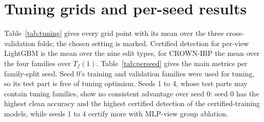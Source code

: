 \documentclass[preprint,12pt,authoryear]{elsarticle}
\begin{document}
\FloatBarrier
\section{Tuning grids and per-seed results}\label{app:tuning}
Table~\ref{tab:tuning} gives every grid point with its mean over the three cross-validation folds; the chosen setting is marked. Certified detection for per-view LightGBM is the mean over the nine edit types, for CROWN-IBP the mean over the four families over $T_f(1)$. Table~\ref{tab:perseed} gives the main metrics per family-split seed. Seed 0's training and validation families were used for tuning, so its test part is free of tuning optimism. Seeds 1 to 4, whose test parts may contain tuning families, show no consistent advantage over seed 0: seed 0 has the highest clean accuracy and the highest certified detection of the certified-training models, while seeds 1 to 4 certify more with MLP-view group ablation. %

\begin{table}[!htbp]
\centering\small
\caption{Tuning grids (grouped 3-fold cross-validation, fold means, \%). $\ast$: chosen setting.}\label{tab:tuning}

\end{table}

\begin{table}[!htbp]
\centering\small
\caption{Main metrics (\%) per family-split seed.}\label{tab:perseed}
\resizebox{\textwidth}{!}{}
\end{table}



\end{document}
